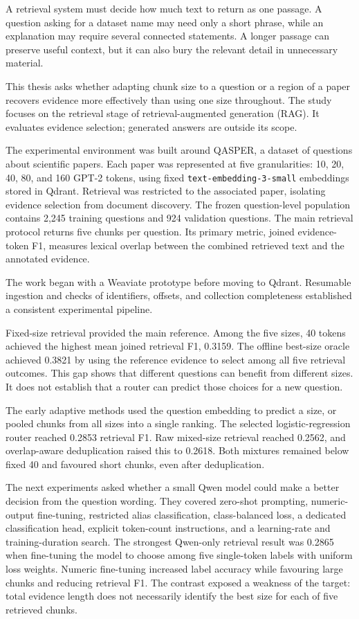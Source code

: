 A retrieval system must decide how much text to return as one passage.
A question asking for a dataset name may need only a short phrase,
while an explanation may require several connected statements. A longer
passage can preserve useful context, but it can also bury the relevant
detail in unnecessary material.

This thesis asks whether adapting chunk size to a question or a region
of a paper recovers evidence more effectively than using one size
throughout. The study focuses on the retrieval stage of
retrieval-augmented generation (RAG). It evaluates evidence selection;
generated answers are outside its scope.

The experimental environment was built around QASPER, a dataset of
questions about scientific papers. Each paper was represented at five
granularities: 10, 20, 40, 80, and 160 GPT-2 tokens, using fixed
\texttt{text-embedding-3-small} embeddings stored in Qdrant. Retrieval
was restricted to the associated paper, isolating evidence selection
from document discovery.
The frozen question-level population contains 2,245 training questions
and 924 validation questions. The main retrieval protocol returns five
chunks per question. Its primary metric, joined evidence-token F1,
measures lexical overlap between the combined retrieved text and the
annotated evidence.

The work began with a Weaviate prototype before moving to Qdrant.
Resumable ingestion and checks of identifiers, offsets, and collection
completeness established a consistent experimental pipeline.

Fixed-size retrieval provided the main reference. Among the five sizes,
40 tokens achieved the highest mean joined retrieval F1, 0.3159. The
offline best-size oracle achieved 0.3821 by using the reference evidence
to select among all five retrieval outcomes. This gap shows that different
questions can benefit from different sizes. It does not establish that
a router can predict those choices for a new question.

The early adaptive methods used the question embedding to predict a size,
or pooled chunks from all sizes into a single ranking. The selected
logistic-regression router reached 0.2853 retrieval F1. Raw mixed-size
retrieval reached 0.2562, and overlap-aware deduplication raised this to
0.2618. Both mixtures remained below fixed 40 and favoured short chunks,
even after deduplication.

\newpage
The next experiments asked whether a small Qwen model could make a better
decision from the question wording. They covered zero-shot prompting,
numeric-output fine-tuning, restricted alias classification, class-balanced
loss, a dedicated classification head, explicit token-count instructions,
and a learning-rate and training-duration search. The strongest
Qwen-only retrieval result was 0.2865 when fine-tuning the model to choose
among five single-token labels with uniform loss weights. Numeric
fine-tuning increased label accuracy while favouring
large chunks and reducing retrieval F1. The contrast exposed a weakness
of the target: total evidence length does not necessarily identify the
best size for each of five retrieved chunks.

